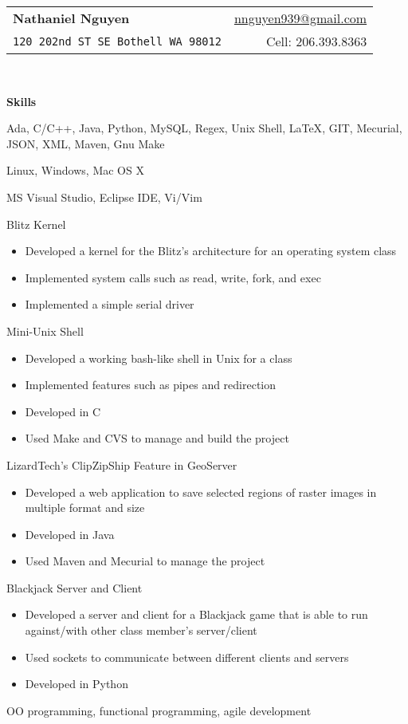 \documentclass[letterpaper,11pt]{article}
\newcommand{\resitem}[1]{\item #1 \vspace{-2pt}}
\newcommand{\resheading}[1]{{\large \colorbox{mygrey}{\begin{minipage}{\textwidth}{\textbf{#1 \vphantom{p\^{E}}}}\end{minipage}}}}
\begin{document}
\newcommand{\mywebheader}{
\begin{tabular*}{7in}{l@{\extracolsep{\fill}}r}
	\textbf{{\LARGE Nathaniel Nguyen}} & \href{mailto:nnguyen939@gmail.com}{nnguyen939@gmail.com}\\
	{\footnotesize \texttt{{120 202nd ST SE Bothell WA 98012}}} & 
	{Cell:  206.393.8363}
	\end{tabular*}
\\
\vspace{0.1in}}

\mywebheader

\resheading{{Skills}}
	\begin{description}
		\item[Technologies:] { \footnotesize Ada, C/C++, Java, Python, MySQL, Regex, Unix Shell, {\LaTeX}, GIT, Mecurial, JSON, XML, Maven, Gnu Make}
		\item[Computer and OS:] { \footnotesize Linux, Windows, Mac OS X}
		\item[Software:]{\footnotesize
			{MS Visual Studio},
			{Eclipse IDE},
			{Vi/Vim}
} 
		\item[Projects:] {\footnotesize 
							\item Blitz Kernel
								\begin{itemize}
									\resitem{Developed a kernel for the Blitz's architecture for an operating system class}
									\resitem{Implemented system calls such as read, write, fork, and exec}
									\resitem{Implemented a simple serial driver}
								\end{itemize}
							\item Mini-Unix Shell
								\begin{itemize}
									\resitem{Developed a working bash-like shell in Unix for a class}
									\resitem{Implemented features such as pipes and redirection}
									\resitem{Developed in C}
									\resitem{Used Make and CVS to manage and build the project}
								\end{itemize}
								
							\item LizardTech's ClipZipShip Feature in GeoServer
								\begin{itemize}
									\resitem{Developed a web application to save selected regions of raster images in multiple format and size}
									\resitem{Developed in Java}
									\resitem{Used Maven and Mecurial to manage the project}
								\end{itemize}
							\item Blackjack Server and Client
								\begin{itemize}
									\resitem{Developed a server and client for a Blackjack game that is able to run against/with other class member's server/client}
									\resitem{Used sockets to communicate between different clients and servers}
									\resitem{Developed in Python}
								\end{itemize}
						}
			\item[Others:] {\footnotesize OO programming, functional programming, agile development}
	\end{description} %
	
\end{document}
